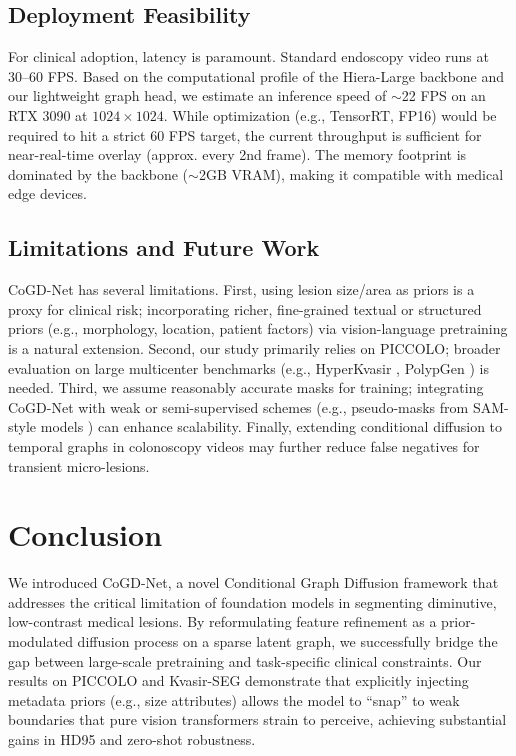 \documentclass{article}
\begin{document}
\subsection{Deployment Feasibility}
For clinical adoption, latency is paramount. Standard endoscopy video runs at 30--60 FPS. 
Based on the computational profile of the Hiera-Large backbone and our lightweight graph head, we estimate an inference speed of $\sim$22 FPS on an RTX 3090 at $1024\times1024$.
While optimization (e.g., TensorRT, FP16) would be required to hit a strict 60 FPS target, the current throughput is sufficient for near-real-time overlay (approx. every 2nd frame).
The memory footprint is dominated by the backbone ($\sim$2GB VRAM), making it compatible with medical edge devices.

\subsection{Limitations and Future Work}
CoGD-Net has several limitations. First, using lesion size/area as priors is a proxy for clinical risk; incorporating richer, fine-grained textual or structured priors (e.g., morphology, location, patient factors) via vision-language pretraining \cite{Radford2021CLIP,Zhang2023BiomedCLIP,Lin2023PMCCLIP} is a natural extension. Second, our study primarily relies on PICCOLO; broader evaluation on large multicenter benchmarks (e.g., HyperKvasir \cite{Borgli2020HyperKvasir}, PolypGen \cite{Ali2023PolypGen}) is needed. Third, we assume reasonably accurate masks for training; integrating CoGD-Net with weak or semi-supervised schemes (e.g., pseudo-masks from SAM-style models \cite{Kirillov2023SAM,Ma2023MedSAM}) can enhance scalability. Finally, extending conditional diffusion to temporal graphs in colonoscopy videos \cite{Bernal2017EndoscopicVisionChallenge} may further reduce false negatives for transient micro-lesions.

\section{Conclusion}

We introduced CoGD-Net, a novel Conditional Graph Diffusion framework that addresses the critical limitation of foundation models in segmenting diminutive, low-contrast medical lesions. By reformulating feature refinement as a prior-modulated diffusion process on a sparse latent graph, we successfully bridge the gap between large-scale pretraining and task-specific clinical constraints. Our results on PICCOLO and Kvasir-SEG demonstrate that explicitly injecting metadata priors (e.g., size attributes) allows the model to ``snap'' to weak boundaries that pure vision transformers strain to perceive, achieving substantial gains in HD95 and zero-shot robustness.
\end{document}
